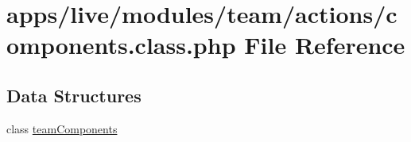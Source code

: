 \hypertarget{live_2modules_2team_2actions_2components_8class_8php}{\section{apps/live/modules/team/actions/components.class.\-php File Reference}
\label{live_2modules_2team_2actions_2components_8class_8php}
}
\subsection*{Data Structures}
\begin{DoxyCompactItemize}
\item 
class \hyperlink{classteam_components}{team\-Components}
\end{DoxyCompactItemize}
